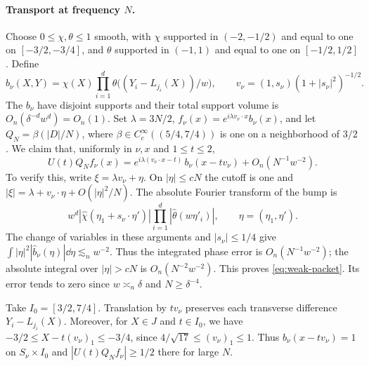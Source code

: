 \paragraph{Transport at frequency \(N\).}
Choose $0\le\chi,\theta\le1$ smooth, with $\chi$ supported in
$(-2,-1/2)$ and equal to one on $[-3/2,-3/4]$, and $\theta$ supported
in $(-1,1)$ and equal to one on $[-1/2,1/2]$. Define
\[
 b_\nu(X,Y)=\chi(X)\prod_{i=1}^d
       \theta\big((Y_i-L_{j_i}(X))/w\big),\qquad
 v_\nu=(1,s_\nu)(1+|s_\nu|^2)^{-1/2}.
\]
The $b_\nu$ have disjoint supports and their total support volume is
$O_n(\delta^{-d}w^d)=O_n(1)$. Set $\lambda=3N/2$,
$f_\nu(x)=e^{i\lambda v_\nu\cdot x}b_\nu(x)$, and let
$Q_N=\beta(|D|/N)$, where $\beta\in C_c^\infty((5/4,7/4))$ is one
on a neighborhood of $3/2$. We claim that, uniformly in $\nu,x$ and
$1\le t\le2$,
\begin{equation}\label{eq:weak-packet}
 U(t)Q_N f_\nu(x)=
 e^{i\lambda(v_\nu\cdot x-t)}\,b_\nu(x-tv_\nu)+O_n(N^{-1}w^{-2}).
\end{equation}
To verify this, write $\xi=\lambda v_\nu+\eta$. On $|\eta|\le cN$ the
cutoff is one and $|\xi|=\lambda+v_\nu\cdot\eta+O(|\eta|^2/N)$.
The absolute Fourier transform of the bump is
\[
 w^d|\widehat\chi(\eta_1+s_\nu\cdot\eta')|
      \prod_{i=1}^d|\widehat\theta(w\eta'_i)|,
 \qquad \eta=(\eta_1,\eta').
\]
The change of variables in these arguments and $|s_\nu|\le1/4$ give
$\int|\eta|^2|\widehat b_\nu(\eta)|\dd\eta\lesssim_n w^{-2}$.
Thus the integrated phase error is $O_n(N^{-1}w^{-2})$; the absolute
integral over $|\eta|>cN$ is $O_n(N^{-2}w^{-2})$.
This proves \eqref{eq:weak-packet}. Its error tends to zero since
$w\asymp_n\delta$ and $N\ge\delta^{-4}$.

Take $I_0=[3/2,7/4]$. Translation by $tv_\nu$ preserves each
transverse difference $Y_i-L_{j_i}(X)$. Moreover, for $X\in J$ and
$t\in I_0$, we have $-3/2\le X-t(v_\nu)_1\le-3/4$, since
$4/\sqrt{17}\le(v_\nu)_1\le1$. Thus $b_\nu(x-tv_\nu)=1$ on
$S_\nu\times I_0$ and $|U(t)Q_N f_\nu|\ge1/2$ there for large $N$.

